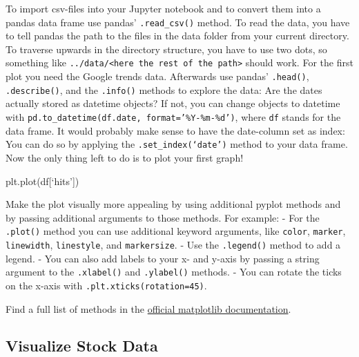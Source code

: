 \documentclass[
  11pt,
]{article}
\newenvironment{Shaded}{\begin{snugshade}}{\end{snugshade}}
\newcommand{\NormalTok}[1]{#1}
\newenvironment{tipsp}[1]
  {
  \begin{itemize}
  \footnotesize
  \renewcommand{\labelitemi}{
    \raisebox{-.7\height}[0pt][0pt]{
      {\setkeys{Gin}{width=3em,keepaspectratio}
        \texttt{[image: images/\#1.png]}}
    }
  }
  \setlength{\fboxsep}{1em}
  \begin{pbox}
  \item
  }
  {
  \end{pbox}
  \end{itemize}
  }
\begin{document}
\begin{tipsp}p

To import csv-files into your Jupyter notebook and to convert them into a pandas data frame use pandas' \texttt{.read\_csv()} method.
To read the data, you have to tell pandas the path to the files in the data folder from your current directory. To traverse upwards in the directory structure, you have to use two dots, so something like \texttt{../data/\textless{}here\ the\ rest\ of\ the\ path\textgreater{}} should work. For the first plot you need the Google trends data.
Afterwards use pandas' \texttt{.head()}, \texttt{.describe()}, and the \texttt{.info()} methods to explore the data: Are the dates actually stored as datetime objects? If not, you can change objects to datetime with \texttt{pd.to\_datetime(df.date,\ format=’\%Y-\%m-\%d’)}, where \texttt{df} stands for the data frame.
It would probably make sense to have the date-column set as index: You can do so by applying the \texttt{.set\_index(‘date’)} method to your data frame.
Now the only thing left to do is to plot your first graph!

\begin{Shaded}
\begin{Highlighting}[]
\NormalTok{plt.plot(df[‘hits’])}
\end{Highlighting}
\end{Shaded}

Make the plot visually more appealing by using additional pyplot methods and by passing additional arguments to those methods. For example:
- For the \texttt{.plot()} method you can use additional keyword arguments, like \texttt{color}, \texttt{marker}, \texttt{linewidth}, \texttt{linestyle}, and \texttt{markersize}.
- Use the \texttt{.legend()} method to add a legend.
- You can also add labels to your x- and y-axis by passing a string argument to the \texttt{.xlabel()} and \texttt{.ylabel()} methods.
- You can rotate the ticks on the x-axis with \texttt{.plt.xticks(rotation=45)}.

Find a full list of methods in the \href{https://matplotlib.org/3.1.1/api/pyplot_summary.html}{official matplotlib documentation}.

\end{tipsp}

\hypertarget{visualize-stock-data}{%
\subsection{Visualize Stock Data}\label{visualize-stock-data}}
\end{document}
